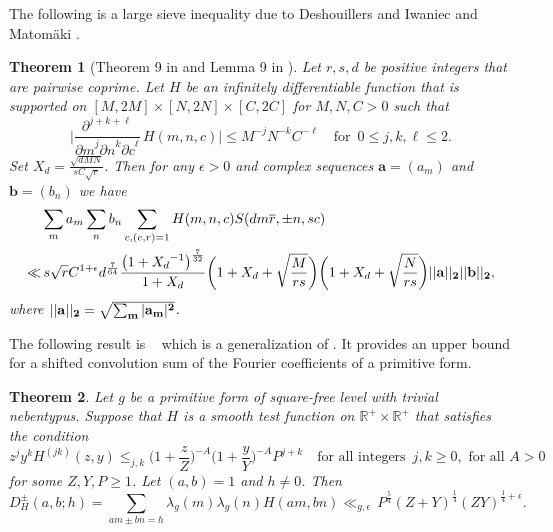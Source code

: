 \documentclass[12pt]{amsart}
\theoremstyle{plain}
\newtheorem{thm}{Theorem}[section]
\theoremstyle{definition}
\begin{document}
The following is a  large sieve inequality due to Deshouillers and Iwaniec  \cite[Theorem 9]{DI} and  Matom\"{a}ki \cite[Lemma 9]{Matomaki}.

\begin{thm}[Theorem 9 in \cite{DI} and Lemma 9 in \cite{Matomaki}] \label{Matomaki}
Let $r, s, d$ be positive integers that are pairwise coprime. Let $H$ be an infinitely differentiable function that is supported on $[M, 2M]\times [N, 2N] \times [C, 2C]$ for $M, N, C>0$ such that
    \[ 
    \bigg| \frac{\partial^{j+k+\ell}}{{\partial m}^j {\partial n}^k {\partial c}^\ell} \, H(m, n, c) \bigg| 
     \leq M^{-j} N^{-k} C^{-\ell} \quad
     \text{for } \, 0\leq j, k, \ell \leq 2.
    \]
Set $X_{d}= \frac{\sqrt{dMN}}{sC\sqrt{r}}$. Then for any $\epsilon>0$ and complex sequences $\textbf{a}=(a_m)$ and $\textbf{b}=(b_n)$ we have
    \begin{align*}
    & \sum_m a_m 
    \sum_n b_n 
    \sum_{c, (c, r)=1} H(m, n, c)
    S(d m \overline{r}, \pm n, sc) \\
    \ll
    &\, s\sqrt{r} C^{1+\epsilon} {d}^{\frac{7}{64}}
    \frac{\big(1+{X_{d}}^{-1}\big)^{\frac{7}{32}}}{1+X_{d}}
    \bigg(1+X_{d}+\sqrt{\frac{M}{r s}}\bigg)
    \bigg(1+X_{d}+\sqrt{\frac{N}{r s}}\bigg)
    ||\bf{a}||_2 ||\bf{b}||_2 ,
    \end{align*}
where $||\bf{a}||_2  = \sqrt{\sum_{m} |a_m|^2}$. 
\end{thm}



The following result is ~\cite[Proposition B.1]{KMV RS} which is a generalization of \cite[Theorem 1]{DFI}.  It provides an upper bound for a shifted convolution sum of the Fourier coefficients of a primitive form.


\begin{thm}\label{DFI type result}
Let $g$ be a primitive form of square-free level with trivial nebentypus. Suppose that $H$ is a smooth test function on $\mathbb{R}^+ \times \mathbb{R}^+$ that satisfies the condition
    \begin{equation}\label{eq:DFI H condition}
    z^j y^k H^{(jk)}(z, y)
    \leq_{j, k} 
    \Big(1+\frac{z}{Z}\Big)^{-A}
    \Big(1+\frac{y}{Y}\Big)^{-A}
    P^{j+k}
    \quad \text{for all integers } \, j, k \geq 0 , \,\, \text{for all } A>0
    \end{equation}
for some $Z, Y, P \geq 1$. Let $(a, b)=1$ and $h\neq 0$. Then 
    \begin{equation}\label{eq:DFI smoothed sum}
    D_H^{\pm}(a, b ; h)
    = \sum_{a m\pm b n=h }
    \lambda_g(m) \lambda_g(n) H(a m, b n)
    \ll_{g, \epsilon}
    \,
    P^{\frac54} (Z+Y)^{\frac14}
    (ZY)^{\frac14+\epsilon}.
    \end{equation}
\end{thm}
\end{document}
